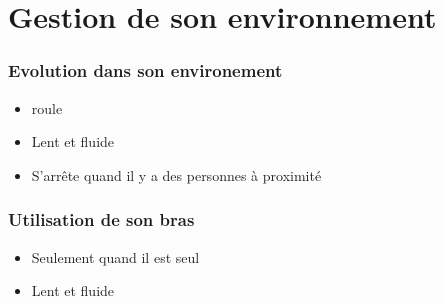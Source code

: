 \section{Gestion de son environnement}

\begin{frame}
	\frametitle{Evolution dans son environement}
	\begin{itemize}
	\item roule
	\item Lent et fluide
	\item S'arrête quand il y a des personnes à proximité
	\end{itemize}
\end{frame}

\begin{frame}
	\frametitle{Utilisation de son bras}
	\begin{itemize}
	\item Seulement quand il est seul
	\item Lent et fluide
	\end{itemize}

\end{frame}
